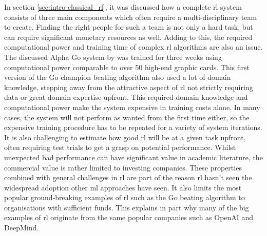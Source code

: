 In section \ref{sec:intro-classical_rl}, it was discussed how a complete \gls{rl} system consists of three main components which often require a multi-disciplinary team to create.
Finding the right people for such a team is not only a hard task, but can require significant monetary resources as well.
Adding to this, the required computational power and training time of complex \gls{rl} algorithms are also an issue.
The discussed Alpha Go system by \citet{alphago} was trained for three weeks using computational power comparable to over 50 high-end graphic cards.
This first version of the Go champion beating algorithm also used a lot of domain knowledge, stepping away from the attractive aspect of \gls{rl} not strictly requiring data or great domain expertise upfront.
This required domain knowledge and computational power make the system expensive in training costs alone.
In many cases, the system will not perform as wanted from the first time either, so the expensive training procedure has to be repeated for a variety of system iterations.
It is also challenging to estimate how good \gls{rl} will be at a given task upfront, often requiring test trials to get a grasp on potential performance.
Whilst unexpected bad performance can have significant value in academic literature, the commercial value is rather limited to investing companies.
These properties combined with general challenges in \gls{rl} are part of the reason \gls{rl} hasn't seen the widespread adoption other \gls{ml} approaches have seen.
It also limits the most popular ground-breaking examples of \gls{rl} such as the Go beating algorithm to organisations with sufficient funds.
This explains in part why many of the big examples of \gls{rl} originate from the same popular companies such as OpenAI and DeepMind.

